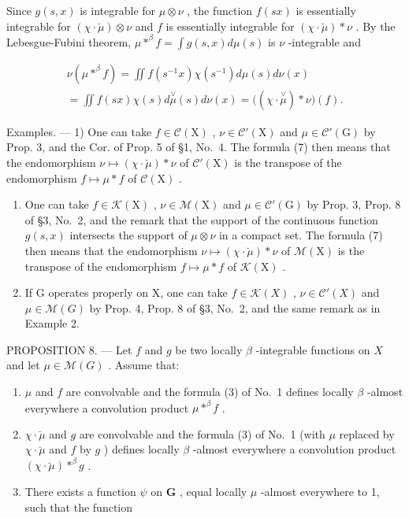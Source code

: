 Since \(g(s, x)\) is integrable for \(\mu \otimes \nu\) , the function \(f(sx)\) is essentially integrable for \((\chi \cdot \breve{\mu}) \otimes \nu\) and \(f\) is essentially integrable for \((\chi \cdot \breve{\mu}) * \nu\) . By the Lebesgue-Fubini theorem, \(\mu *^{\beta} f = \int g(s, x) d\mu(s)\) is \(\nu\) -integrable and

\[
\begin{array}{l} \nu (\mu * ^ {\beta} f) = \iint f (s ^ {- 1} x) \chi (s ^ {- 1}) d \mu (s) d \nu (x) \\ = \iint f (s x) \chi (s) d \stackrel {\vee} {\mu} (s) d \nu (x) = \big ((\chi \cdot \stackrel {\vee} {\mu}) * \nu \big) (f). \end{array}
\]

Examples. --- 1) One can take \(f \in \mathcal{C}(\mathrm{X})\) , \(\nu \in \mathcal{C}'(\mathrm{X})\) and \(\mu \in \mathcal{C}'(\mathrm{G})\) by Prop. 3, and the Cor. of Prop. 5 of §1, No.~4. The formula (7) then means that the endomorphism \(\nu \mapsto (\chi \cdot \breve{\mu}) * \nu\) of \(\mathcal{C}'(\mathrm{X})\) is the transpose of the endomorphism \(f \mapsto \mu * f\) of \(\mathcal{C}(\mathrm{X})\) .

\begin{enumerate}
\def\labelenumi{\arabic{enumi})}
\setcounter{enumi}{1}
\item
  One can take \(f \in \mathcal{K}(\mathrm{X})\) , \(\nu \in \mathcal{M}(\mathrm{X})\) and \(\mu \in \mathcal{C}'(\mathrm{G})\) by Prop. 3, Prop. 8 of §3, No.~2, and the remark that the support of the continuous function \(g(s,x)\) intersects the support of \(\mu \otimes \nu\) in a compact set. The formula (7) then means that the endomorphism \(\nu \mapsto (\chi \cdot \breve{\mu}) * \nu\) of \(\mathcal{M}(\mathrm{X})\) is the transpose of the endomorphism \(f \mapsto \mu * f\) of \(\mathcal{K}(\mathrm{X})\) .
\item
  If G operates properly on X, one can take \(f \in \mathcal{K}(X)\) , \(\nu \in \mathcal{C}'(X)\) and \(\mu \in \mathcal{M}(G)\) by Prop. 4, Prop. 8 of §3, No.~2, and the same remark as in Example 2.
\end{enumerate}

PROPOSITION 8. --- Let \(f\) and \(g\) be two locally \(\beta\) -integrable functions on \(X\) and let \(\mu \in \mathcal{M}(G)\) . Assume that:

\begin{enumerate}
\def\labelenumi{(\roman{enumi})}
\item
  \(\mu\) and \(f\) are convolvable and the formula (3) of No.~1 defines locally \(\beta\) -almost everywhere a convolution product \(\mu *^{\beta} f\) .
\item
  \(\chi \cdot \breve{\mu}\) and \(g\) are convolvable and the formula (3) of No.~1 (with \(\mu\) replaced by \(\chi \cdot \breve{\mu}\) and \(f\) by \(g\) ) defines locally \(\beta\) -almost everywhere a convolution product \((\chi \cdot \breve{\mu}) *^{\beta} g\) .
\item
  There exists a function \(\psi\) on \(\mathbf{G}\) , equal locally \(\mu\) -almost everywhere to 1, such that the function
\end{enumerate}

